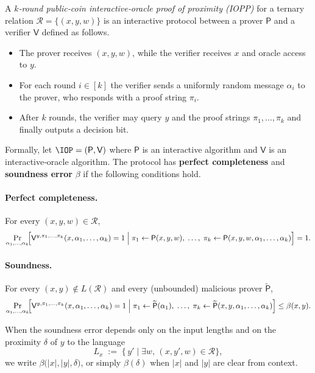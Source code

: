 \begin{definition}\label{def:iopp}
    A \emph{$k$‑round public‑coin interactive‑oracle proof of proximity
    (IOPP)} for a ternary relation $\mathcal R = \{(x,y,w)\}$ is an
    interactive protocol between a prover $\mathsf P$ and a verifier
    $\mathsf V$ defined as follows.
    
    \begin{itemize}
      \item The prover receives $(x,y,w)$, while the verifier receives $x$
            and oracle access to $y$.
    
      \item For each round $i\in[k]$ the verifier sends a uniformly random
            message $\alpha_i$ to the prover, who responds with a proof
            string $\pi_i$.
    
      \item After $k$ rounds, the verifier may query $y$ and the proof
            strings $\pi_1,\dots,\pi_k$ and finally outputs a decision bit.
    \end{itemize}
    
    Formally, let $\IOP=(\mathsf P,\mathsf V)$ where $\mathsf P$ is an
    interactive algorithm and $\mathsf V$ is an interactive‑oracle algorithm.
    The protocol has \textbf{perfect completeness} and \textbf{soundness
    error} $\beta$ if the following conditions hold.
    
    \paragraph{Perfect completeness.}
    For every $(x,y,w)\in\mathcal R$,
    \[
      \Pr_{\alpha_1,\ldots,\alpha_k}\!\Bigl[
        \mathsf V^{y,\pi_1,\ldots,\pi_k}(x,\alpha_1,\ldots,\alpha_k)=1
        \;\Big|\;
        \pi_1\leftarrow\mathsf P(x,y,w),\;
        \dots,\;
        \pi_k\leftarrow\mathsf P(x,y,w,\alpha_1,\ldots,\alpha_k)
      \Bigr]=1.
    \]
    
    \paragraph{Soundness.}
    For every $(x,y)\notin L(\mathcal R)$ and every (unbounded) malicious
    prover $\widetilde{\mathsf P}$,
    \[
      \Pr_{\alpha_1,\ldots,\alpha_k}\!\Bigl[
        \mathsf V^{y,\pi_1,\ldots,\pi_k}(x,\alpha_1,\ldots,\alpha_k)=1
        \;\Big|\;
        \pi_1\leftarrow\widetilde{\mathsf P}(\alpha_1),\;
        \dots,\;
        \pi_k\leftarrow\widetilde{\mathsf P}
              (x,y,\alpha_1,\ldots,\alpha_k)
      \Bigr]\le \beta(x,y).
    \]
    
    When the soundness error depends only on the input lengths and on the
    proximity $\delta$ of $y$ to the language
    \[
      L_x \;:=\; \{\,y' \mid \exists w,\,(x,y',w)\in\mathcal R\},
    \]
    we write $\beta\bigl(|x|,|y|,\delta\bigr)$, or simply
    $\beta(\delta)$ when $|x|$ and $|y|$ are clear from context.
    \end{definition}
    